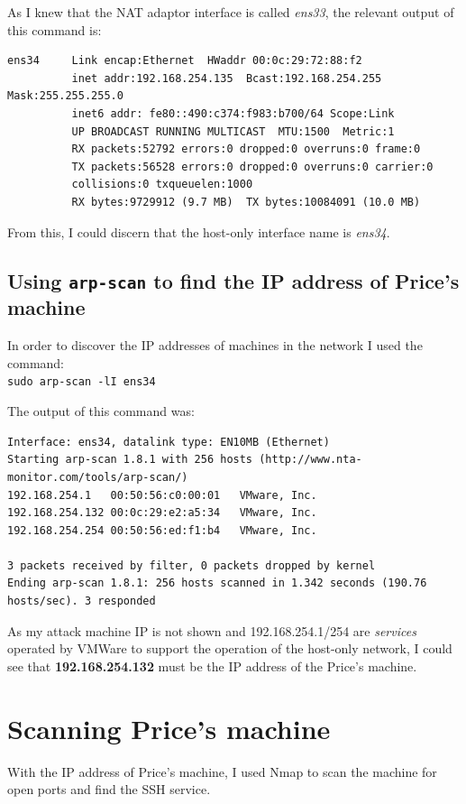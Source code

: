 \documentclass[12pt]{report}
\newcommand{\term}[1]{\colorbox{light-gray}{\texttt{#1}}}
\begin{document}
As I knew that the NAT adaptor interface is called \textit{ens33}, the relevant output of this command is:
\begin{Verbatim}[frame=leftline]
ens34     Link encap:Ethernet  HWaddr 00:0c:29:72:88:f2
          inet addr:192.168.254.135  Bcast:192.168.254.255  Mask:255.255.255.0
          inet6 addr: fe80::490:c374:f983:b700/64 Scope:Link
          UP BROADCAST RUNNING MULTICAST  MTU:1500  Metric:1
          RX packets:52792 errors:0 dropped:0 overruns:0 frame:0
          TX packets:56528 errors:0 dropped:0 overruns:0 carrier:0
          collisions:0 txqueuelen:1000
          RX bytes:9729912 (9.7 MB)  TX bytes:10084091 (10.0 MB)
\end{Verbatim}

From this, I could discern that the host-only interface name is \textit{ens34}.

\subsection*{Using \texttt{arp-scan} to find the IP address of Price's machine}
In order to discover the IP addresses of machines in the network I used the command:\\
\term{sudo arp-scan -lI ens34}

The output of this command was:
\begin{Verbatim}[frame=leftline, fontsize=\small]
Interface: ens34, datalink type: EN10MB (Ethernet)
Starting arp-scan 1.8.1 with 256 hosts (http://www.nta-monitor.com/tools/arp-scan/)
192.168.254.1	00:50:56:c0:00:01	VMware, Inc.
192.168.254.132	00:0c:29:e2:a5:34	VMware, Inc.
192.168.254.254	00:50:56:ed:f1:b4	VMware, Inc.

3 packets received by filter, 0 packets dropped by kernel
Ending arp-scan 1.8.1: 256 hosts scanned in 1.342 seconds (190.76 hosts/sec). 3 responded
\end{Verbatim}

As my attack machine IP is not shown and 192.168.254.1/254 are \textit{services} operated by VMWare to support the operation of the host-only network, I could see that \textbf{192.168.254.132} must be the IP address of the Price's machine.


\section{Scanning Price's machine}
With the IP address of Price's machine, I used Nmap to scan the machine for open ports and find the SSH service.
\end{document}
